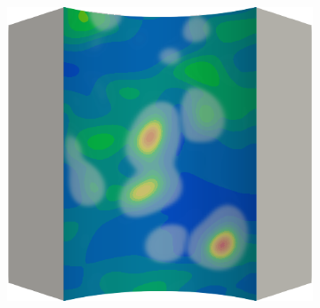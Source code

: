 \begin{figure}[!htbp]
\begin{subfigure}{0.19\textwidth}
  \end{subfigure}
  \hspace{0.06\textwidth}
  \begin{subfigure}{0.19\textwidth}
    \centering
    \includegraphics[width=\textwidth]{Chapter5/figures/spallation/ep.0012}
  \end{subfigure}
  

\end{figure}
